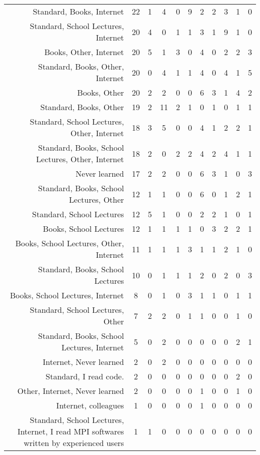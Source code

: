 {\begin{landscape}
\begin{longtable}[htb]{r|c|c|c|c|c|c|c|c|c|c}
{Standard, Books, Internet} & 22 & 1 & 4 & 0 & 9 & 2 & 2 & 3 & 1 & 0 \\%
{Standard, School Lectures, Internet} & 20 & 4 & 0 & 1 & 1 & 3 & 1 & 9 & 1 & 0 \\%
{Books, Other, Internet} & 20 & 5 & 1 & 3 & 0 & 4 & 0 & 2 & 2 & 3 \\%
{Standard, Books, Other, Internet} & 20 & 0 & 4 & 1 & 1 & 4 & 0 & 4 & 1 & 5 \\%
{Books, Other} & 20 & 2 & 2 & 0 & 0 & 6 & 3 & 1 & 4 & 2 \\%
{Standard, Books, Other} & 19 & 2 & 11 & 2 & 1 & 0 & 1 & 0 & 1 & 1 \\%
{Standard, School Lectures, Other, Internet} & 18 & 3 & 5 & 0 & 0 & 4 & 1 & 2 & 2 & 1 \\%
{Standard, Books, School Lectures, Other, Internet} & 18 & 2 & 0 & 2 & 2 & 4 & 2 & 4 & 1 & 1 \\%
{Never learned} & 17 & 2 & 2 & 0 & 0 & 6 & 3 & 1 & 0 & 3 \\%
{Standard, Books, School Lectures, Other} & 12 & 1 & 1 & 0 & 0 & 6 & 0 & 1 & 2 & 1 \\%
{Standard, School Lectures} & 12 & 5 & 1 & 0 & 0 & 2 & 2 & 1 & 0 & 1 \\%
{Books, School Lectures} & 12 & 1 & 1 & 1 & 1 & 0 & 3 & 2 & 2 & 1 \\%
{Books, School Lectures, Other, Internet} & 11 & 1 & 1 & 1 & 3 & 1 & 1 & 2 & 1 & 0 \\%
{Standard, Books, School Lectures} & 10 & 0 & 1 & 1 & 1 & 2 & 0 & 2 & 0 & 3 \\%
{Books, School Lectures, Internet} & 8 & 0 & 1 & 0 & 3 & 1 & 1 & 0 & 1 & 1 \\%
{Standard, School Lectures, Other} & 7 & 2 & 2 & 0 & 1 & 1 & 0 & 0 & 1 & 0 \\%
{Standard, Books, School Lectures, Internet} & 5 & 0 & 2 & 0 & 0 & 0 & 0 & 0 & 2 & 1 \\%
{Internet, Never learned} & 2 & 0 & 2 & 0 & 0 & 0 & 0 & 0 & 0 & 0 \\%
{Standard, I read code.} & 2 & 0 & 0 & 0 & 0 & 0 & 0 & 0 & 2 & 0 \\%
{Other, Internet, Never learned} & 2 & 0 & 0 & 0 & 0 & 1 & 0 & 0 & 1 & 0 \\%
{Internet, colleagues} & 1 & 0 & 0 & 0 & 0 & 1 & 0 & 0 & 0 & 0 \\%
{Standard, School Lectures, Internet, I read MPI softwares written by experienced users} & 1 & 1 & 0 & 0 & 0 & 0 & 0 & 0 & 0 & 0 \\%

\end{longtable}
\end{landscape}}
